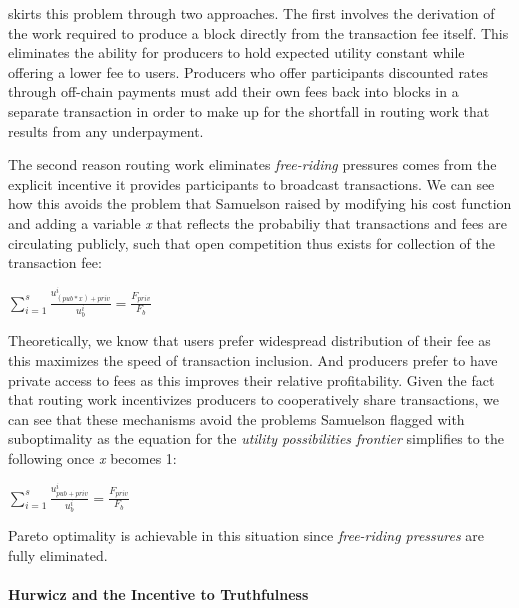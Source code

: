 \ourTFM skirts this problem through two approaches. The first involves the derivation of the work required to produce a block directly from the transaction fee itself. This eliminates the ability for producers to hold expected utility constant while offering a lower fee to users. Producers who offer participants discounted rates through off-chain payments must add their own fees back into blocks in a separate transaction in order to make up for the shortfall in routing work that results from any underpayment.

The second reason routing work eliminates \textit{free-riding} pressures comes from the explicit incentive it provides participants to broadcast transactions. We can see how this avoids the problem that Samuelson raised by modifying his cost function and adding a variable \textit{x} that reflects the probabiliy that transactions and fees are circulating publicly, such that open competition thus exists for collection of the transaction fee:

\LARGE
\begin{adjustwidth}{1.5em}{1.5em}
\begin{math}
\sum_{i=1}^{s} \frac{u_{({pub}*{x})+{priv}}^i}{u_b^i} = \frac{F_{{priv}}}{F_b}
\end{math}
\end{adjustwidth}
\normalsize

Theoretically, we know that users prefer widespread distribution of their fee as this maximizes the speed of transaction inclusion. And producers prefer to have private access to fees as this improves their relative profitability. Given the fact that routing work incentivizes producers to cooperatively share transactions, we can see that these mechanisms avoid the problems Samuelson flagged with suboptimality as the equation for the \textit{utility possibilities frontier} simplifies to the following once \textit{x} becomes 1:

\LARGE
\begin{adjustwidth}{1.5em}{1.5em}
\begin{math}
\sum_{i=1}^{s} \frac{u_{{pub}+{priv}}^i}{u_b^i} = \frac{F_{{priv}}}{F_b}
\end{math}
\end{adjustwidth}
\normalsize

Pareto optimality is achievable in this situation since \textit{free-riding pressures} are fully eliminated.

\paragraph{Hurwicz and the Incentive to Truthfulness}

